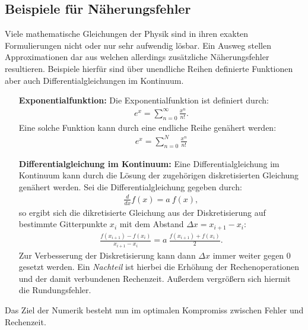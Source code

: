 \documentclass{scrartcl}
\begin{document}
\subsection{Beispiele für Näherungsfehler}
Viele mathematische Gleichungen der Physik sind in ihren exakten Formulierungen nicht oder nur sehr aufwendig lösbar. Ein Ausweg stellen Approximationen dar aus welchen allerdings zusätzliche Näherungsfehler resultieren.
Beispiele hierfür sind über unendliche Reihen definierte Funktionen aber auch Differentialgleichungen im Kontinuum.
\begin{itemize}
\item[\textbf{Exponentialfunktion:}]Die Exponentialfunktion ist definiert durch:
\begin{align*}
e^x=\sum_{n=0}^{\infty}\frac{x^n}{n!}.
\end{align*}
Eine solche Funktion kann durch eine endliche Reihe genähert werden:
\begin{align*}
e^x=\sum_{n=0}^{N}\frac{x^n}{n!}
\end{align*}
\item[\textbf{Differentialgleichung im Kontinuum:}]Eine Differentialgleichung im Kontinuum kann durch die Lösung der zugehörigen diskretisierten Gleichung genähert werden.
Sei die Differentialgleichung gegeben durch:
\begin{align*}
\frac{d}{dx}f(x)=a \ f(x),
\end{align*}
so ergibt sich die dikretisierte Gleichung aus der Diskretisierung auf  
bestimmte Gitterpunkte $x_i$ mit dem Abstand $\Delta x=x_{i+1}-x_i$:
\begin{align*}
\frac{f(x_{i+1})-f(x_i)}{x_{i+1}-x_i}=a \ \frac{f(x_{i+1})+f(x_i)}{2}.
\end{align*}
Zur Verbesserung der Diskretisierung kann dann $\Delta x$ immer weiter gegen $0$ gesetzt werden.
Ein \textit{Nachteil} ist hierbei die Erhöhung der Rechenoperationen und der damit verbundenen Rechenzeit. Außerdem vergrößern sich hiermit die Rundungsfehler.
\end{itemize}
Das Ziel der Numerik besteht nun im optimalen Kompromiss zwischen Fehler und Rechenzeit.
\end{document}

